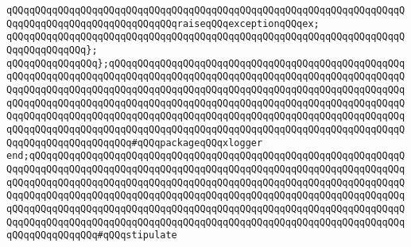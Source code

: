 \verb|qQQqqQQqqQQqqQQqqQQqqQQqqQQqqQQqqQQqqQQqqQQqqQQqqQQqqQQqqQQqqQQqqQQqqQQqqQQqqQQqqQQqqQQqqQQqqQQqqQQqraiseqQQqexceptionqQQqex;|\newline
\verb|qQQqqQQqqQQqqQQqqQQqqQQqqQQqqQQqqQQqqQQqqQQqqQQqqQQqqQQqqQQqqQQqqQQqqQQqqQQqqQQqqQQq};|\newline
\newline
\verb|qQQqqQQqqQQqqQQq};qQQqqQQqqQQqqQQqqQQqqQQqqQQqqQQqqQQqqQQqqQQqqQQqqQQqqQQqqQQqqQQqqQQqqQQqqQQqqQQqqQQqqQQqqQQqqQQqqQQqqQQqqQQqqQQqqQQqqQQqqQQqqQQqqQQqqQQqqQQqqQQqqQQqqQQqqQQqqQQqqQQqqQQqqQQqqQQqqQQqqQQqqQQqqQQqqQQqqQQqqQQqqQQqqQQqqQQqqQQqqQQqqQQqqQQqqQQqqQQqqQQqqQQqqQQqqQQqqQQqqQQqqQQqqQQqqQQqqQQqqQQqqQQqqQQqqQQqqQQqqQQqqQQqqQQqqQQqqQQqqQQqqQQqqQQqqQQqqQQqqQQqqQQqqQQqqQQqqQQqqQQqqQQqqQQqqQQqqQQqqQQqqQQqqQQqqQQqqQQqqQQqqQQqqQQqqQQqqQQqqQQq#qQQqpackageqQQqxlogger|\newline
\verb|end;qQQqqQQqqQQqqQQqqQQqqQQqqQQqqQQqqQQqqQQqqQQqqQQqqQQqqQQqqQQqqQQqqQQqqQQqqQQqqQQqqQQqqQQqqQQqqQQqqQQqqQQqqQQqqQQqqQQqqQQqqQQqqQQqqQQqqQQqqQQqqQQqqQQqqQQqqQQqqQQqqQQqqQQqqQQqqQQqqQQqqQQqqQQqqQQqqQQqqQQqqQQqqQQqqQQqqQQqqQQqqQQqqQQqqQQqqQQqqQQqqQQqqQQqqQQqqQQqqQQqqQQqqQQqqQQqqQQqqQQqqQQqqQQqqQQqqQQqqQQqqQQqqQQqqQQqqQQqqQQqqQQqqQQqqQQqqQQqqQQqqQQqqQQqqQQqqQQqqQQqqQQqqQQqqQQqqQQqqQQqqQQqqQQqqQQqqQQqqQQqqQQqqQQqqQQqqQQqqQQqqQQqqQQqqQQq#qQQqstipulate|\newline
\newline

